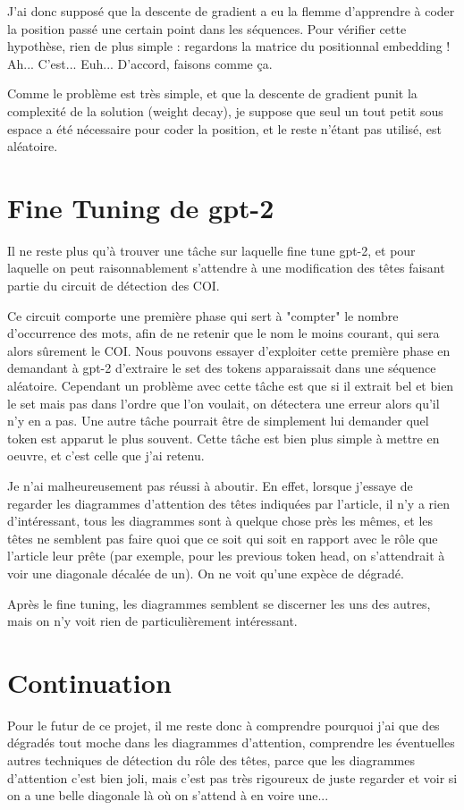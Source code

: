 \documentclass{article}
\begin{document}
J'ai donc supposé que la descente de gradient a eu la flemme d'apprendre à coder la position passé une certain point dans les séquences. Pour vérifier cette hypothèse, rien de plus simple : regardons la matrice du positionnal embedding ! Ah... C'est... Euh... D'accord, faisons comme ça.

Comme le problème est très simple, et que la descente de gradient punit la complexité de la solution (weight decay), je suppose que seul un tout petit sous espace a été nécessaire pour coder la position, et le reste n'étant pas utilisé, est aléatoire.

\section{Fine Tuning de gpt-2}

Il ne reste plus qu'à trouver une tâche sur laquelle fine tune gpt-2, et pour laquelle on peut raisonnablement s'attendre à une modification des têtes faisant partie du circuit de détection des COI.

Ce circuit comporte une première phase qui sert à "compter" le nombre d'occurrence des mots, afin de ne retenir que le nom le moins courant, qui sera alors sûrement le COI. Nous pouvons essayer d'exploiter cette première phase en demandant à gpt-2 d'extraire le set des tokens apparaissait dans une séquence aléatoire. Cependant un problème avec cette tâche est que si il extrait bel et bien le set mais pas dans l'ordre que l'on voulait, on détectera une erreur alors qu'il n'y en a pas. Une autre tâche pourrait être de simplement lui demander quel token est apparut le plus souvent. Cette tâche est bien plus simple à mettre en oeuvre, et c'est celle que j'ai retenu.\newline

Je n'ai malheureusement pas réussi à aboutir. En effet, lorsque j'essaye de regarder les diagrammes d'attention des têtes indiquées par l'article, il n'y a rien d'intéressant, tous les diagrammes sont à quelque chose près les mêmes, et les têtes ne semblent pas faire quoi que ce soit qui soit en rapport avec le rôle que l'article leur prête (par exemple, pour les previous token head, on s'attendrait à voir une diagonale décalée de un). On ne voit qu'une expèce de dégradé.

Après le fine tuning, les diagrammes semblent se discerner les uns des autres, mais on n'y voit rien de particulièrement intéressant.

\section{Continuation}
Pour le futur de ce projet, il me reste donc à comprendre pourquoi j'ai que des dégradés tout moche dans les diagrammes d'attention, comprendre les éventuelles autres techniques de détection du rôle des têtes, parce que les diagrammes d'attention c'est bien joli, mais c'est pas très rigoureux de juste regarder et voir si on a une belle diagonale là où on s'attend à en voire une...
\end{document}
